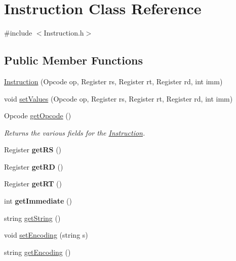 \hypertarget{class_instruction}{}\section{Instruction Class Reference}
\label{class_instruction}


{\ttfamily \#include $<$Instruction.\+h$>$}

\subsection*{Public Member Functions}
\begin{DoxyCompactItemize}
\item 
\mbox{\hyperlink{class_instruction_acf9058307d344be3005b10ba1b642ef0}{Instruction}} (Opcode op, Register rs, Register rt, Register rd, int imm)
\item 
void \mbox{\hyperlink{class_instruction_ab7bd4ac378e25f67296e30ab421602f8}{set\+Values}} (Opcode op, Register rs, Register rt, Register rd, int imm)
\item 
\mbox{\label{class_instruction_af934b7598fcb3db6e4493cce118c4eb8}} 
Opcode \mbox{\hyperlink{class_instruction_af934b7598fcb3db6e4493cce118c4eb8}{get\+Opcode}} ()
\begin{DoxyCompactList}\small\item\em Returns the various fields for the \mbox{\hyperlink{class_instruction}{Instruction}}. \end{DoxyCompactList}\item 
\mbox{\label{class_instruction_a1e9448534e3c29339794e59434921375}} 
Register {\bfseries get\+RS} ()
\item 
\mbox{\label{class_instruction_a093410083994dc233c21719b31a05aa2}} 
Register {\bfseries get\+RD} ()
\item 
\mbox{\label{class_instruction_a4e03550d8976160fd678cee3a9a26881}} 
Register {\bfseries get\+RT} ()
\item 
\mbox{\label{class_instruction_a01bb4a1f66f15b1921ba5c9e18320115}} 
int {\bfseries get\+Immediate} ()
\item 
string \mbox{\hyperlink{class_instruction_a3deaa9fb80e0e3e5fbc6b32efaea2f98}{get\+String}} ()
\item 
void \mbox{\hyperlink{class_instruction_ab10e98d595622a19f2ed0c94098692a2}{set\+Encoding}} (string s)
\item 
string \mbox{\hyperlink{class_instruction_a478d5c0c11c0e72b53c73643447e15c3}{get\+Encoding}} ()
\end{DoxyCompactItemize}


